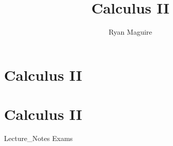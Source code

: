 \documentclass[crop=false,class=book,oneside]{standalone}
\begin{document}
    \newif\ifmathcoursescalculusII
    \ifx\ifmathcourses\undefined
        \title{Calculus II}
        \author{Ryan Maguire}
        \date{\vspace{-5ex}}
        \maketitle
        \tableofcontents
        \chapter*{Calculus II}
        \setcounter{chapter}{1}
    \else
        \chapter{Calculus II}
    \fi
    {Lecture_Notes}
    {Exams}
\end{document}
